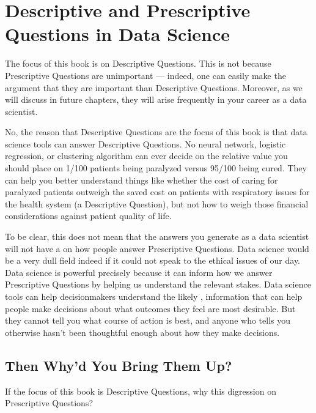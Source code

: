 \documentclass[letterpaper,10pt,english]{jupyterBook}
\begin{document}
\section{Descriptive and Prescriptive Questions in Data Science}
\label{\detokenize{30_questions/05_descriptive_v_prescriptive:descriptive-and-prescriptive-questions-in-data-science}}
\sphinxAtStartPar
The focus of this book is on Descriptive Questions. This is not because Prescriptive Questions are unimportant — indeed, one can easily make the argument that they are  important than Descriptive Questions. Moreover, as we will discuss in future chapters, they will arise frequently in your career as a data scientist.

\sphinxAtStartPar
No, the reason that Descriptive Questions are the focus of this book is that data science tools can  answer Descriptive Questions. No neural network, logistic regression, or clustering algorithm can ever decide on the relative value you should place on 1/100 patients being paralyzed versus 95/100 being cured. They can help you better understand things like whether the cost of caring for paralyzed patients outweigh the saved cost on patients with respiratory issues for the health system (a Descriptive Question), but not how to weigh those financial considerations against patient quality of life.

\sphinxAtStartPar
To be clear, this does not mean that the answers you generate as a data scientist will not have a  on how people answer Prescriptive Questions. Data science would be a very dull field indeed if it could not speak to the ethical issues of our day. Data science is powerful precisely because it can inform how we answer Prescriptive Questions by helping us understand the relevant stakes. Data science tools can help decision\sphinxhyphen{}makers understand the likely , information that can help people make  decisions about what outcomes they feel are most desirable. But they cannot tell you what course of action is best, and anyone who tells you otherwise hasn’t been thoughtful enough about how they make decisions.


\subsection{Then Why’d You Bring Them Up?}
\label{\detokenize{30_questions/05_descriptive_v_prescriptive:then-why-d-you-bring-them-up}}
\sphinxAtStartPar
If the focus of this book is Descriptive Questions, why this digression on Prescriptive Questions?
\end{document}
